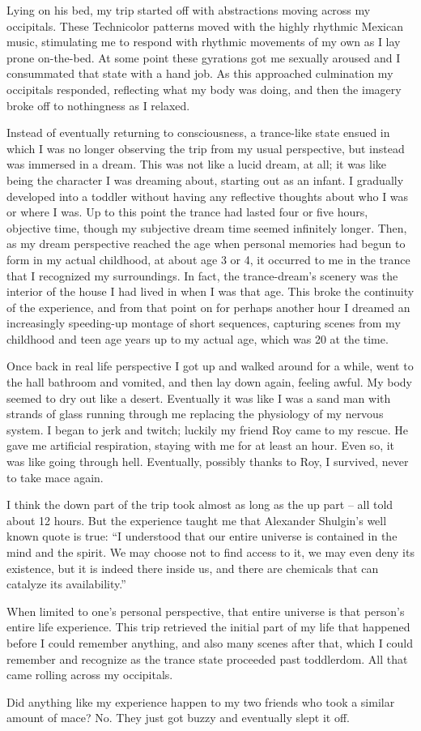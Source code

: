 \documentclass[letterpaper,12pt]{article}
\begin{document}
Lying on his bed, my trip started off with abstractions moving across my occipitals. These Technicolor patterns moved with the highly rhythmic Mexican music, stimulating me to respond with rhythmic movements of my own as I lay prone on-the-bed. At some point these gyrations got me sexually aroused and I consummated that state with a hand job. As this approached culmination my occipitals responded, reflecting what my body was doing, and then the imagery broke off to nothingness as I relaxed.

Instead of eventually returning to consciousness, a trance-like state ensued in which I was no longer observing the trip from my usual perspective, but instead was immersed in a dream. This was not like a lucid dream, at all; it was like being the character I was dreaming about, starting out as an infant. I gradually developed into a toddler without having any reflective thoughts about who I was or where I was. Up to this point the trance had lasted four or five hours, objective time, though my subjective dream time seemed infinitely longer. Then, as my dream perspective reached the age when personal memories had begun to form in my actual childhood, at about age 3 or 4, it occurred to me in the trance that I recognized my surroundings. In fact, the trance-dream's scenery was the interior of the house I had lived in when I was that age. This broke the continuity of the experience, and from that point on for perhaps another hour I dreamed an increasingly speeding-up montage of short sequences, capturing scenes from my childhood and teen age years up to my actual age, which was 20 at the time.

Once back in real life perspective I got up and walked around for a while, went to the hall bathroom and vomited, and then lay down again, feeling awful. My body seemed to dry out like a desert. Eventually it was like I was a sand man with strands of glass running through me replacing the physiology of my nervous system. I began to jerk and twitch; luckily my friend Roy came to my rescue. He gave me artificial respiration, staying with me for at least an hour. Even so, it was like going through hell. Eventually, possibly thanks to Roy, I survived, never to take mace again.

I think the down part of the trip took almost as long as the up part -- all told about 12 hours. But the experience taught me that Alexander Shulgin's well known quote is true: ``I understood that our entire universe is contained in the mind and the spirit. We may choose not to find access to it, we may even deny its existence, but it is indeed there inside us, and there are chemicals that can catalyze its availability.''

When limited to one's personal perspective, that entire universe is that person's entire life experience. This trip retrieved the initial part of my life that happened before I could remember anything, and also many scenes after that, which I could remember and recognize as the trance state proceeded past toddlerdom. All that came rolling across my occipitals.

Did anything like my experience happen to my two friends who took a similar amount of mace? No. They just got buzzy and eventually slept it off.
\end{document}
